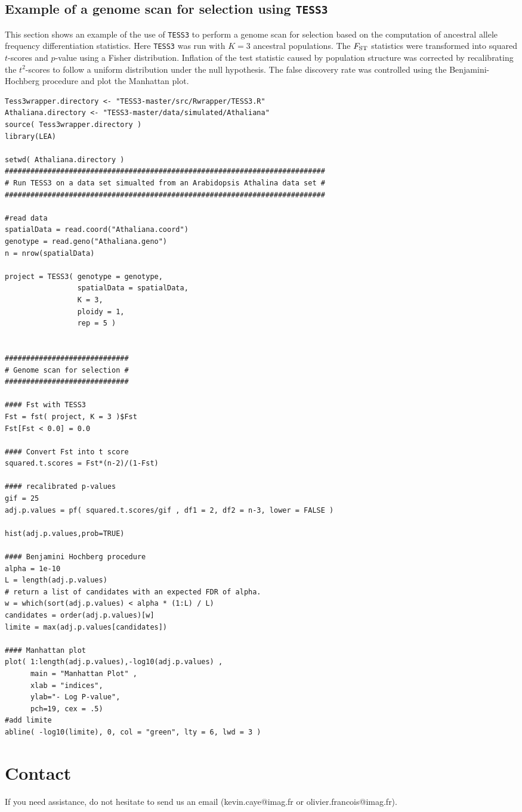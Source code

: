 \documentclass[10pt,a4paper]{article}
\begin{document}


\subsection{Example of a genome scan for selection using {\tt TESS3}}
This section shows an example of the use of {\tt TESS3} to perform a genome scan for selection based on the computation of ancestral allele frequency differentiation statistics. Here {\tt TESS3} was run with $K = 3$ ancestral populations. The $F_{\rm ST}$ statistics were transformed into squared $t$-scores and $p$-value using a Fisher distribution. Inflation of the test statistic caused by population structure was corrected by recalibrating the $t^2$-scores to follow a uniform distribution under the null hypothesis. The false discovery rate was controlled using the Benjamini-Hochberg procedure and plot the Manhattan plot.


\begin{Verbatim}[frame=single]
Tess3wrapper.directory <- "TESS3-master/src/Rwrapper/TESS3.R"
Athaliana.directory <- "TESS3-master/data/simulated/Athaliana"
source( Tess3wrapper.directory )
library(LEA)

setwd( Athaliana.directory )
###########################################################################
# Run TESS3 on a data set simualted from an Arabidopsis Athalina data set #
###########################################################################

#read data
spatialData = read.coord("Athaliana.coord")
genotype = read.geno("Athaliana.geno")
n = nrow(spatialData)

project = TESS3( genotype = genotype, 
                 spatialData = spatialData, 
                 K = 3, 
                 ploidy = 1, 
                 rep = 5 )


#############################
# Genome scan for selection #
#############################

#### Fst with TESS3 
Fst = fst( project, K = 3 )$Fst
Fst[Fst < 0.0] = 0.0

#### Convert Fst into t score
squared.t.scores = Fst*(n-2)/(1-Fst)

#### recalibrated p-values
gif = 25
adj.p.values = pf( squared.t.scores/gif , df1 = 2, df2 = n-3, lower = FALSE )

hist(adj.p.values,prob=TRUE)

#### Benjamini Hochberg procedure
alpha = 1e-10
L = length(adj.p.values)
# return a list of candidates with an expected FDR of alpha.
w = which(sort(adj.p.values) < alpha * (1:L) / L)
candidates = order(adj.p.values)[w]
limite = max(adj.p.values[candidates])

#### Manhattan plot 
plot( 1:length(adj.p.values),-log10(adj.p.values) , 
      main = "Manhattan Plot" , 
      xlab = "indices", 
      ylab="- Log P-value", 
      pch=19, cex = .5) 
#add limite
abline( -log10(limite), 0, col = "green", lty = 6, lwd = 3 )
\end{Verbatim}


\section{Contact}
If you need assistance, do not hesitate to send us an email (kevin.caye@imag.fr or olivier.francois@imag.fr). 



\end{document}
